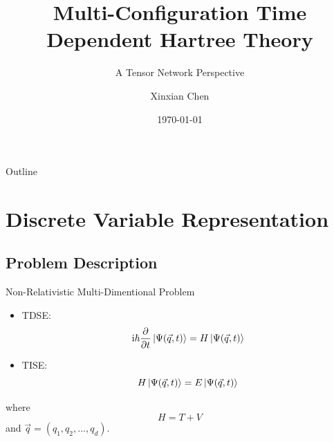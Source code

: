 \documentclass[12pt]{beamer}
\newcommand{\iu}{\mathrm{i}}
\begin{document}
    \title{Multi-Configuration Time Dependent Hartree Theory}
    \subtitle{A Tensor Network Perspective}
    \author{Xinxian Chen}
    \date{\today}

    \frame{\titlepage}

    \begin{frame}{Outline}
        \tableofcontents[hidesubsections] 
    \end{frame}
    
    \section{Discrete Variable Representation}
    \subsection{Problem Description}
    \begin{frame}{Non-Relativistic Multi-Dimentional Problem}
        \begin{itemize}
            \item TDSE:
            \begin{equation*}
                \iu \hbar \pdv{t} \ket{\Psi(\vec{q}, t)} = H \ket{\Psi(\vec{q}, t)}
            \end{equation*}
            \item TISE:
            \begin{equation*}
                H \ket{\Psi(\vec{q}, t)} = E \ket{\Psi(\vec{q}, t)}
            \end{equation*}
        \end{itemize}
        
        where $$H = T + V$$
        and $\vec{q} = \left(q_1, q_2, \ldots, q_d\right)$.
    \end{frame}
\end{document}
